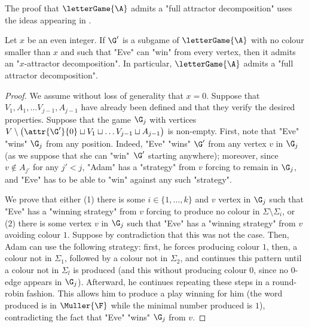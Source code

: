 \documentclass[10pt,a4paper]{amsart}
\renewcommand{\SS}{\Sigma}
\begin{document}
The proof that $\letterGame{\A}$ admits a "full attractor decomposition" uses the ideas appearing in \cite[Section~3]{DJW1997memory}.
\begin{lemma}
	Let $x$ be an even integer. If $\G'$ is a subgame of $\letterGame{\A}$  with no colour smaller than $x$ and such that "Eve" can "win" from every vertex, then it admits an "$x$-attractor decomposition".
	In particular, $\letterGame{\A}$ admits a "full attractor decomposition".
\end{lemma}
\begin{proof}
	We assume without loss of generality that $x=0$.
	Suppose that $V_1, A_1,\dots V_{j-1}, A_{j-1}$ have already been defined and that they verify the desired properties. Suppose that the game $\G_j$ with vertices $V\setminus \left(\attr{\G'}{0} \sqcup V_1 \sqcup \dots  V_{j-1} \sqcup A_{j-1}\right)$ is non-empty. First, note that "Eve" "wins" $\G_j$ from any position. Indeed, "Eve" "wins" $\G'$ from any vertex $v$ in $\G_j$ (as we suppose that she can "win"~$\G'$ starting anywhere); moreover, since $v\notin A_{j'}$ for any $j'<j$, "Adam" has a "strategy" from $v$ forcing to remain in $\G_j$, and "Eve" has to be able to "win" against any such "strategy".
	
	We prove that either (1) there is some $i\in \{1,\dots, k\}$ and $v$ vertex in $\G_j$ such that "Eve" has a "winning strategy" from $v$ forcing to produce no colour in $\SS\setminus \SS_i$, or (2) there is some vertex $v$ in $\G_j$  such that "Eve" has a "winning strategy" from $v$ avoiding colour $1$. Suppose by contradiction that this was not the case. Then, Adam can use the following strategy: first, he forces producing colour $1$, then, a colour not in $\SS_1$, followed by a colour not in $\SS_2$, and continues this pattern until a colour not in $\SS_l$ is produced (and this without producing colour $0$, since no $0$-edge appears in $\G_j$). Afterward, he continues repeating these steps in a round-robin fashion. This allows him to produce a play winning for him (the word produced is in $\Muller{\F}$ while the minimal number produced is $1$), contradicting the fact that "Eve" "wins" $\G_j$ from $v$.
	

\end{proof}
\end{document}
